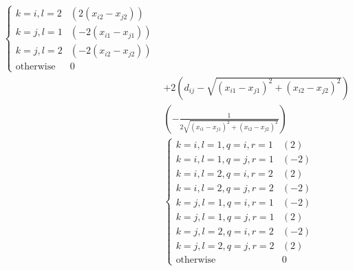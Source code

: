 \documentclass[a4paper,12pt]{article}
\begin{document}
\begin{equation}
\begin{aligned}
\begin{cases}
        k=i,l=2 & \left(2(x_{i2} - x_{j2})\right)\\
        k=j,l=1 & \left(-2(x_{i1} - x_{j1})\right)\\
        k=j,l=2 & \left(-2(x_{i2} - x_{j2})\right)\\
        \text{otherwise} & 0
    \end{cases}
    \\ & + 2 \left(d_{ij} - \sqrt{(x_{i1} - x_{j1})^2 + (x_{i2} - x_{j2})^2} \right)
    \\ & \left(-\frac{1}{2\sqrt{(x_{i1} - x_{j1})^2 + (x_{i2} - x_{j2})^2}} \right) 
    \\ &\begin{cases}
        k=i,l=1,q=i,r=1 & \left(2\right)\\
        k=i,l=1,q=j,r=1 & \left(-2\right)\\
        k=i,l=2,q=i,r=2 & \left(2\right)\\
        k=i,l=2,q=j,r=2 & \left(-2\right)\\
        k=j,l=1,q=i,r=1 & \left(-2\right)\\
        k=j,l=1,q=j,r=1 & \left(2\right)\\
        k=j,l=2,q=i,r=2 & \left(-2\right)\\
        k=j,l=2,q=j,r=2 & \left(2\right)\\
        \text{otherwise} & 0
    \end{cases}
\end{aligned}
\end{equation}
\end{document}
